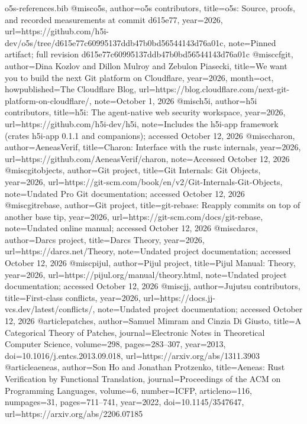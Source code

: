 \begin{filecontents*}[overwrite]{o5s-references.bib}
@misc{o5s, author={{o5s contributors}}, title={{o5s}: Source, proofs, and recorded measurements at commit d615e77}, year={2026}, url={https://github.com/h5i-dev/o5s/tree/d615e77c60995137ddb47b0bd56544143d76a01c}, note={Pinned artifact; full revision d615e77c60995137ddb47b0bd56544143d76a01c}}
@misc{cfgit, author={Dina Kozlov and Dillon Mulroy and Zebulon Piasecki}, title={We want you to build the next Git platform on Cloudflare}, year={2026}, month=oct, howpublished={The Cloudflare Blog}, url={https://blog.cloudflare.com/next-git-platform-on-cloudflare/}, note={October 1, 2026}}
@misc{h5i, author={{h5i contributors}}, title={h5i: The agent-native web security workspace}, year={2026}, url={https://github.com/h5i-dev/h5i}, note={Includes the h5i-app framework (crates h5i-app 0.1.1 and companions); accessed October 12, 2026}}
@misc{charon, author={{AeneasVerif}}, title={Charon: Interface with the rustc internals}, year={2026}, url={https://github.com/AeneasVerif/charon}, note={Accessed October 12, 2026}}
@misc{gitobjects, author={{Git project}}, title={Git Internals: Git Objects}, year={2026}, url={https://git-scm.com/book/en/v2/Git-Internals-Git-Objects}, note={Undated Pro Git documentation; accessed October 12, 2026}}
@misc{gitrebase, author={{Git project}}, title={git-rebase: Reapply commits on top of another base tip}, year={2026}, url={https://git-scm.com/docs/git-rebase}, note={Undated online manual; accessed October 12, 2026}}
@misc{darcs, author={{Darcs project}}, title={Darcs Theory}, year={2026}, url={https://darcs.net/Theory}, note={Undated project documentation; accessed October 12, 2026}}
@misc{pijul, author={{Pijul project}}, title={Pijul Manual: Theory}, year={2026}, url={https://pijul.org/manual/theory.html}, note={Undated project documentation; accessed October 12, 2026}}
@misc{jj, author={{Jujutsu contributors}}, title={First-class conflicts}, year={2026}, url={https://docs.jj-vcs.dev/latest/conflicts/}, note={Undated project documentation; accessed October 12, 2026}}
@article{patches, author={Samuel Mimram and Cinzia Di Giusto}, title={A Categorical Theory of Patches}, journal={Electronic Notes in Theoretical Computer Science}, volume={298}, pages={283--307}, year={2013}, doi={10.1016/j.entcs.2013.09.018}, url={https://arxiv.org/abs/1311.3903}}
@article{aeneas, author={Son Ho and Jonathan Protzenko}, title={Aeneas: Rust Verification by Functional Translation}, journal={Proceedings of the ACM on Programming Languages}, volume={6}, number={ICFP}, articleno={116}, numpages={31}, pages={711--741}, year={2022}, doi={10.1145/3547647}, url={https://arxiv.org/abs/2206.07185}}

\end{filecontents*}
